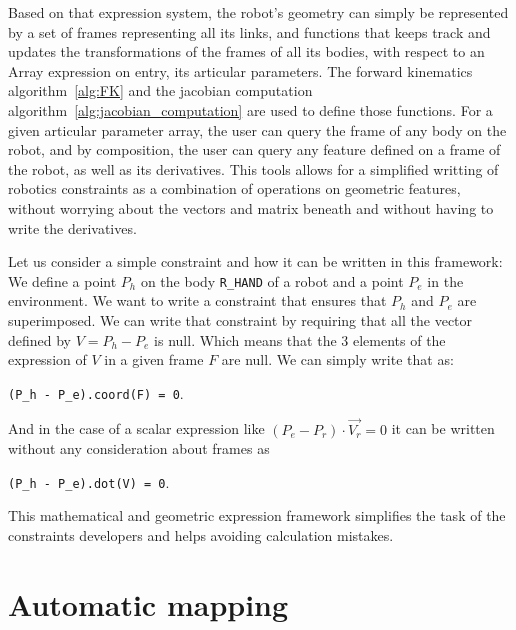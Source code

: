 Based on that expression system, the robot's geometry can simply be represented by a set of frames representing all its links, and functions that keeps track and updates the transformations of the frames of all its bodies, with respect to an Array expression on entry, its articular parameters.
The forward kinematics algorithm~\ref{alg:FK} and the jacobian computation algorithm~\ref{alg:jacobian_computation} are used to define those functions.
For a given articular parameter array, the user can query the frame of any body on the robot, and by composition, the user can query any feature defined on a frame of the robot, as well as its derivatives.
This tools allows for a simplified writting of robotics constraints as a combination of operations on geometric features, without worrying about the vectors and matrix beneath and without having to write the derivatives.

Let us consider a simple constraint and how it can be written in this framework:
We define a point $P_h$ on the body {\tt R\_HAND} of a robot and a point $P_e$ in the environment.
We want to write a constraint that ensures that $P_h$ and $P_e$ are superimposed.
We can write that constraint by requiring that all the vector defined by $V = P_h - P_e$ is null.
Which means that the 3 elements of the expression of $V$ in a given frame $F$ are null.
We can simply write that as:
\begin{center}
{\tt(P\_h - P\_e).coord(F) = 0}.
\end{center}
And in the case of a scalar expression like $(P_e - P_r)\cdot \overrightarrow{V_r} = 0$ it can be written without any consideration about frames as
\begin{center}
{\tt(P\_h - P\_e).dot(V) = 0}.
\end{center}

This mathematical and geometric expression framework simplifies the task of the constraints developers and helps avoiding calculation mistakes.

\section{Automatic mapping}
\label{sec:automatic_mapping}


